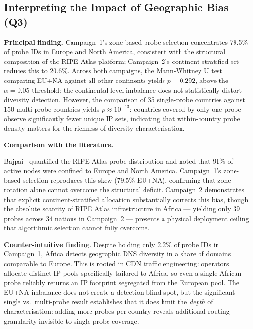 \bigskip
\subsection{Interpreting the Impact of Geographic Bias (Q3)}
\label{subsec:5.1.3}

\textbf{Principal finding.} Campaign~1's zone-based probe selection concentrates 79.5\% of probe IDs in Europe and North America, consistent with the structural composition of the RIPE Atlas platform; Campaign~2's continent-stratified set reduces this to 20.6\%. Across both campaigns, the Mann-Whitney U test comparing EU+NA against all other continents yields $p = 0.292$, above the $\alpha = 0.05$ threshold: the continental-level imbalance does not statistically distort diversity detection. However, the comparison of 35 single-probe countries against 150 multi-probe countries yields $p \approx 10^{-13}$: countries covered by only one probe observe significantly fewer unique \ac{IP} sets, indicating that within-country probe density matters for the richness of diversity characterisation.

\textbf{Comparison with the literature.}

Bajpai~\cite{Bajpai2017} quantified the RIPE Atlas probe distribution and noted that 91\% of active nodes were confined to Europe and North America. Campaign~1's zone-based selection reproduces this skew (79.5\% EU+NA), confirming that zone rotation alone cannot overcome the structural deficit. Campaign~2 demonstrates that explicit continent-stratified allocation substantially corrects this bias, though the absolute scarcity of RIPE Atlas infrastructure in Africa --- yielding only 39 probes across 34 nations in Campaign~2 --- presents a physical deployment ceiling that algorithmic selection cannot fully overcome.

\textbf{Counter-intuitive finding.} Despite holding only 2.2\% of probe IDs in Campaign~1, Africa detects geographic \ac{DNS} diversity in a share of domains comparable to Europe. This is rooted in \ac{CDN} traffic engineering: operators allocate distinct \ac{IP} pools specifically tailored to Africa, so even a single African probe reliably returns an \ac{IP} footprint segregated from the European pool. The EU+NA imbalance does not create a detection blind spot, but the significant single vs.\ multi-probe result establishes that it does limit the \emph{depth} of characterisation: adding more probes per country reveals additional routing granularity invisible to single-probe coverage.

